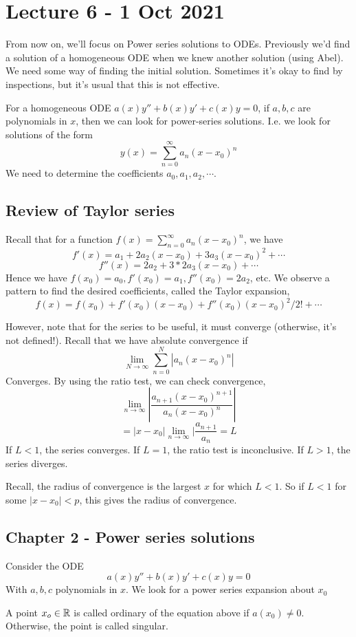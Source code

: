 \section{Lecture 6 - 1 Oct 2021}
From now on, we'll focus on Power series solutions to ODEs. Previously we'd find a
solution of a homogeneous ODE when we knew another solution (using Abel). We need some way
of finding the initial solution. Sometimes it's okay to find by inspections, but it's
usual that this is not effective. 

For a homogeneous ODE $a(x)y''+b(x)y'+c(x)y=0$, if $a,b,c$ are polynomials in $x$, then we
can look for power-series solutions. I.e. we look for solutions of the form
\[y(x)=\sum_{n=0}^{\infty} a_n(x-x_0)^n\]
We need to determine the coefficients $a_0,a_1,a_2,\cdots$.
\subsection{Review of Taylor series}
Recall that for a function $f(x)=\sum_{n=0}^{\infty} a_n(x-x_0)^n$, we have 
\[f'(x)= a_1 + 2a_2(x-x_0) + 3a_3(x-x_0)^2+\cdots\]
\[f''(x)=2a_2 + 3*2 a_3(x-x_0) + \cdots\]
Hence we have $f(x_0)=a_0, f'(x_0)=a_1, f''(x_0)=2a_2$, etc. We observe a pattern to find
the desired coefficients, called the Taylor expansion,
\[f(x)= f(x_0) + f'(x_0)(x-x_0) + f''(x_0)(x-x_0)^2/2! + \cdots\]

However, note that for the series to be useful, it must converge (otherwise, it's not
defined!). Recall that we have absolute convergence if 
\[\lim_{N\to \infty} \sum_{n=0}^N |a_n(x-x_0)^n|\]
Converges. By using the ratio test, we can check convergence,
\[\lim_{n\to \infty} |\frac{a_{n+1}(x-x_0)^{n+1}}{a_n(x-x_0)^n}|\]
\[=|x-x_0|\lim_{n\to\infty} |\frac{a_{n+1}}{a_n}=L\]
If $L<1$, the series converges. If $L=1$, the ratio test is inconclusive. If $L>1$, the
series diverges. 

Recall, the radius of convergence is the largest $x$ for which $L<1$. So if $L<1$ for some
$|x-x_0|<p$, this gives the radius of convergence.

\subsection{ Chapter 2 - Power series solutions}
Consider the ODE
\[a(x)y''+b(x)y'+c(x)y=0\]
With $a,b,c$ polynomials in $x$. We look for a power series expansion about $x_0$
\begin{definition}
  A point $x_o\in\mathbb R$ is called ordinary of the equation above if $a(x_0)\neq 0$.
  Otherwise, the point is called singular.
  \label{ordinaryPoint}
\end{definition}

